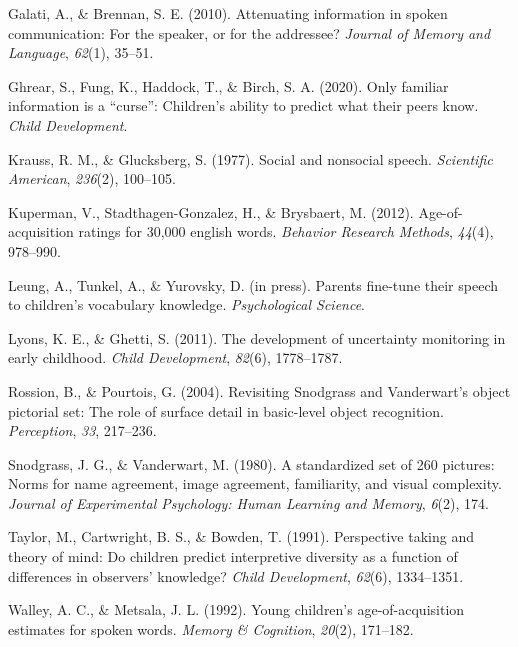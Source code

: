 \documentclass[10pt, letterpaper]{article}
\begin{document}
\leavevmode\hypertarget{ref-galati2010}{}%
Galati, A., \& Brennan, S. E. (2010). Attenuating information in spoken
communication: For the speaker, or for the addressee? \emph{Journal of
Memory and Language}, \emph{62}(1), 35--51.

\leavevmode\hypertarget{ref-ghrear2020}{}%
Ghrear, S., Fung, K., Haddock, T., \& Birch, S. A. (2020). Only familiar
information is a ``curse'': Children's ability to predict what their
peers know. \emph{Child Development}.

\leavevmode\hypertarget{ref-krauss1977}{}%
Krauss, R. M., \& Glucksberg, S. (1977). Social and nonsocial speech.
\emph{Scientific American}, \emph{236}(2), 100--105.

\leavevmode\hypertarget{ref-kuperman2012}{}%
Kuperman, V., Stadthagen-Gonzalez, H., \& Brysbaert, M. (2012).
Age-of-acquisition ratings for 30,000 english words. \emph{Behavior
Research Methods}, \emph{44}(4), 978--990.

\leavevmode\hypertarget{ref-leung2021}{}%
Leung, A., Tunkel, A., \& Yurovsky, D. (in press). Parents fine-tune
their speech to children's vocabulary knowledge. \emph{Psychological
Science}.

\leavevmode\hypertarget{ref-lyons2011}{}%
Lyons, K. E., \& Ghetti, S. (2011). The development of uncertainty
monitoring in early childhood. \emph{Child Development}, \emph{82}(6),
1778--1787.

\leavevmode\hypertarget{ref-rossion2004}{}%
Rossion, B., \& Pourtois, G. (2004). Revisiting Snodgrass and
Vanderwart's object pictorial set: The role of surface detail in
basic-level object recognition. \emph{Perception}, \emph{33}, 217--236.

\leavevmode\hypertarget{ref-snodgrass1980}{}%
Snodgrass, J. G., \& Vanderwart, M. (1980). A standardized set of 260
pictures: Norms for name agreement, image agreement, familiarity, and
visual complexity. \emph{Journal of Experimental Psychology: Human
Learning and Memory}, \emph{6}(2), 174.

\leavevmode\hypertarget{ref-taylor1991}{}%
Taylor, M., Cartwright, B. S., \& Bowden, T. (1991). Perspective taking
and theory of mind: Do children predict interpretive diversity as a
function of differences in observers' knowledge? \emph{Child
Development}, \emph{62}(6), 1334--1351.

\leavevmode\hypertarget{ref-walley1992}{}%
Walley, A. C., \& Metsala, J. L. (1992). Young children's
age-of-acquisition estimates for spoken words. \emph{Memory \&
Cognition}, \emph{20}(2), 171--182.


\end{document}
